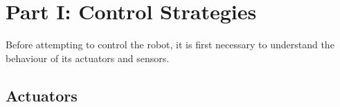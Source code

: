 \documentclass[hidelinks,a4paper,11pt]{article}
\begin{document}
%
%
%
%
%
%





\newpage

\section{Part I: Control Strategies}

Before attempting to control the robot, it is first necessary to understand the behaviour of its actuators and sensors.


\subsection{Actuators}
\end{document}
